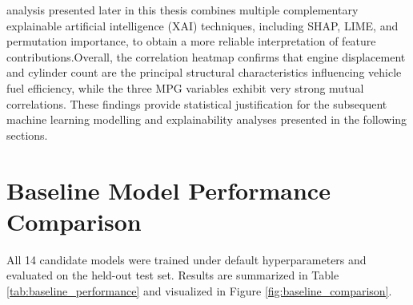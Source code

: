 analysis presented later in this thesis combines multiple complementary explainable artificial intelligence (XAI) techniques, including SHAP, LIME, and permutation importance, to obtain a more reliable interpretation of feature contributions.Overall, the correlation heatmap confirms that engine displacement and cylinder count are the principal structural characteristics influencing vehicle fuel efficiency, while the three MPG variables exhibit very strong mutual correlations. These findings provide statistical justification for the subsequent machine learning modelling and explainability analyses presented in the following sections.



\section{Baseline Model Performance Comparison}

All 14 candidate models were trained under default hyperparameters and evaluated on the held-out test set. Results are summarized in Table \ref{tab:baseline_performance}\cite{atique2026explainable} and visualized in Figure \ref{fig:baseline_comparison}\cite{atique2026explainable}.

